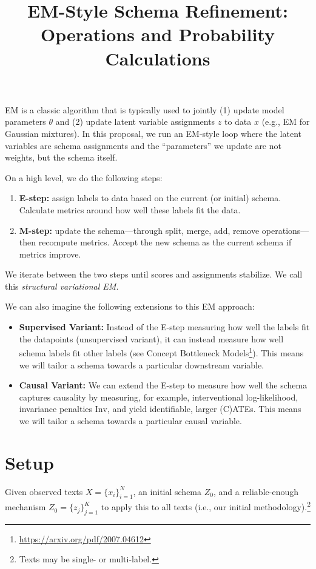 \documentclass[11pt]{article}
\title{EM-Style Schema Refinement: Operations and Probability Calculations}
\author{}
\date{}
\begin{document}
\maketitle

EM is a classic algorithm that is typically used to jointly (1) update model parameters $\theta$ and (2) update latent variable assignments $z$ to data $x$ (e.g., EM for Gaussian mixtures). In this proposal, we run an EM-style loop where the latent variables are schema assignments and the ``parameters'' we update are not weights, but the schema itself.

On a high level, we do the following steps:
\begin{enumerate}[leftmargin=1.3em]
  \item \textbf{E-step:} assign labels to data based on the current (or initial) schema. Calculate metrics around how well these labels fit the data.
  \item \textbf{M-step:} update the schema---through split, merge, add, remove operations---then recompute metrics. Accept the new schema as the current schema if metrics improve.
\end{enumerate}
We iterate between the two steps until scores and assignments stabilize. We call this \emph{structural variational EM}.

We can also imagine the following extensions to this EM approach:
\begin{itemize}[leftmargin=1.3em]
  \item \textbf{Supervised Variant:} Instead of the E-step measuring how well the labels fit the datapoints (unsupervised variant), it can instead measure how well schema labels fit other labels (see Concept Bottleneck Models\footnote{\url{https://arxiv.org/pdf/2007.04612}}). This means we will tailor a schema towards a particular downstream variable.
  \item \textbf{Causal Variant:} We can extend the E-step to measure how well the schema captures causality by measuring, for example, interventional log-likelihood, invariance penalties $\mathrm{Inv}$, and yield identifiable, larger (C)ATEs. This means we will tailor a schema towards a particular causal variable.
\end{itemize}

\section{Setup}
Given observed texts $X = \{x_i\}_{i=1}^N$, an initial schema $Z_0$, and a reliable-enough mechanism $Z_0=\{z_j\}_{j=1}^K$ to apply this to all texts (i.e., our initial methodology).\footnote{Texts may be single- or multi-label.}
\end{document}
